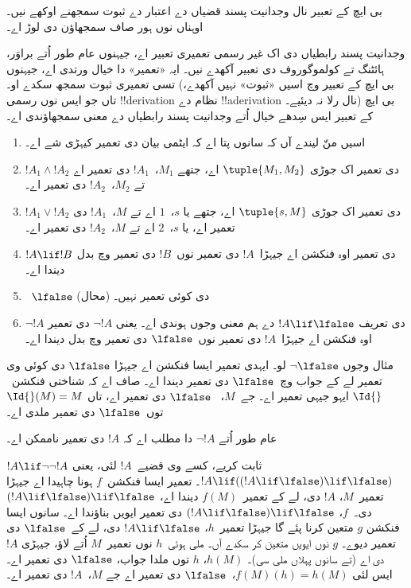 \documentclass[../../../include/open-logic-section]{subfiles}
\begin{document}


\begin{editorial}
  بی ایچ کے تعبیر نال وجدانیت پسند قضیاں دے اعتبار دے ثبوت سمجھنے
  اوکھے نیں۔ اوہناں نوں ہور صاف سمجھاؤن دی لوڑ اے۔
\end{editorial}

وجدانیت پسند رابطیاں دی اک غیر رسمی تعمیری تعبیر اے، جیہنوں عام
طور اُتے براوَر، ہائٹنگ تے کولموگوروف دی تعبیر آکھدے نیں۔ ایہ
«تعمیر» دا خیال ورتدی اے، جیہنوں تسی تعمیری ثبوت سمجھ سکدے او۔
(بی ایچ کے تعبیر وچ اسیں «ثبوت» نہیں آکھدے، تاں جو ایس نوں رسمی
!!{derivation} نظام دے !!a{derivation} نال رلا نہ دیئیے۔) بی ایچ
کے تعبیر ایس سِدھے خیال اُتے وجدانیت پسند رابطیاں دے معنی سمجھاؤندی اے۔

\begin{enumerate}
\item اسیں منّ لیندے آں کہ سانوں پتا اے کہ ایٹمی بیان دی تعمیر
  کیہڑی شے اے۔
\item $!A_1 \land !A_2$ دی تعمیر اک جوڑی $\tuple{M_1, M_2}$ اے،
  جتھے $M_1$،~$!A_1$ دی تعمیر اے تے $M_2$،~$!A_2$ دی تعمیر اے۔
\item $!A_1 \lor !A_2$ دی تعمیر اک جوڑی $\tuple{s, M}$ اے،
  جتھے یا $s$،~$1$ اے تے $M$،~$!A_1$ دی تعمیر اے، یا $s$،~$2$
  اے تے $M$،~$!A_2$ دی تعمیر اے۔
\item $!A \lif !B$ دی تعمیر اوہ فنکشن اے جیہڑا~$!A$ دی تعمیر
  نوں~$!B$ دی تعمیر وچ بدل دیندا اے۔
\item ~$\lfalse$ (محال) دی کوئی تعمیر نہیں۔
\item $\lnot !A$ دی تعریف $!A \lif \lfalse$ دے ہم معنی وجوں ہوندی اے۔
  یعنی $\lnot !A$ دی تعمیر اوہ فنکشن اے جیہڑا~$!A$ دی تعمیر
  نوں~$\lfalse$ دی تعمیر وچ بدل دیندا اے۔
\end{enumerate}

\begin{ex}
مثال وجوں $\lnot \lfalse$ لو۔ ایہدی تعمیر ایسا فنکشن اے جیہڑا
$\lfalse$ دی کوئی وی تعمیر لے کے جواب وچ~$\lfalse$ دی تعمیر دیندا
اے۔ صاف اے کہ شناختی فنکشن~$\Id{}$ ایہو جیہی تعمیر اے۔ جے~$M$،
~$\lfalse$ دی تعمیر اے، تاں $\Id{}(M) = M$ توں~$\lfalse$ دی تعمیر ملدی اے۔
\end{ex}

عام طور اُتے $\lnot !A$ دا مطلب اے کہ $!A$ دی تعمیر ناممکن اے۔

\begin{ex}
$!A \lif \lnot \lnot !A$ ثابت کریے، کسے وی قضیے~$!A$ لئی، یعنی
$!A \lif ((!A \lif \lfalse) \lif \lfalse)$۔ تعمیر ایسا فنکشن~$f$
ہونا چاہیدا اے جیہڑا تعمیر~$M$، $!A$ دی، لے کے تعمیر~$f(M)$
دیندا اے، $(!A \lif \lfalse) \lif \lfalse$ دی۔~$f$،
$(!A \lif \lfalse) \lif \lfalse$ دی تعمیر ایویں بناؤندا اے۔
سانوں ایسا فنکشن $g$ متعین کرنا پئے گا جیہڑا تعمیر~$h$،
$!A \lif \lfalse$ دی، لے کے~$\lfalse$ دی تعمیر دیوے۔ $g$ نوں
ایویں متعین کر سکدے آں۔ ملی ہوئی~$h$ نوں تعمیر~$M$ اُتے لاؤ، جیہڑی
$!A$ دی اے (تے سانوں پہلاں ملی سی)۔ $h(M)$، $h$ توں ملدا جواب،
$\lfalse$ دی تعمیر اے۔ ایس لئی $f(M)(h) = h(M)$،~$\lfalse$ دی تعمیر اے
جے $M$،~$!A$ دی تعمیر اے۔
\end{ex}
\end{document}
